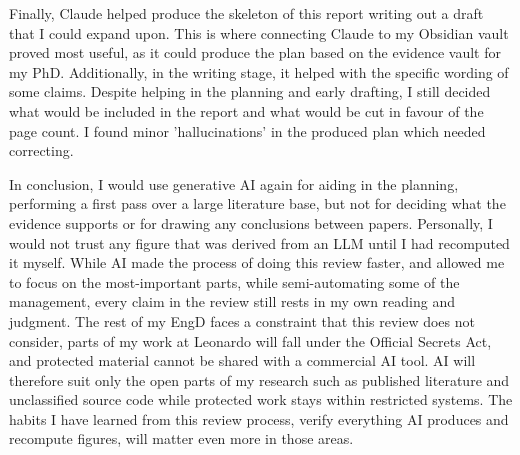 Finally, Claude helped produce the skeleton of this report writing out a draft that I could expand upon. This is where connecting Claude to my Obsidian vault proved most useful, as it could produce the plan based on the evidence vault for my PhD. Additionally, in the writing stage, it helped with the specific wording of some claims. Despite helping in the planning and early drafting, I still decided what would be included in the report and what would be cut in favour of the page count. I found minor 'hallucinations' in the produced plan which needed correcting.

In conclusion, I would use generative AI again for aiding in the planning, performing a first pass over a large literature base, but not for deciding what the evidence supports or for drawing any conclusions between papers. Personally, I would not trust any figure that was derived from an LLM until I had recomputed it myself. While AI made the process of doing this review faster, and allowed me to focus on the most-important parts, while semi-automating some of the management, every claim in the review still rests in my own reading and judgment. The rest of my EngD faces a constraint that this review does not consider, parts of my work at Leonardo will fall under the Official Secrets Act, and protected material cannot be shared with a commercial AI tool. AI will therefore suit only the open parts of my research such as published literature and unclassified source code while protected work stays within restricted systems. The habits I have learned from this review process, verify everything AI produces and recompute figures, will matter even more in those areas.